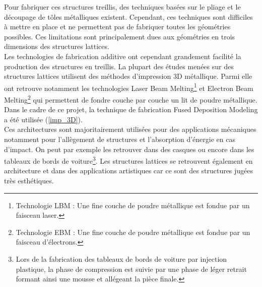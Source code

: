 \documentclass[a4paper]{article}
\begin{document}
	Pour fabriquer ces structures treillis, des techniques basées sur le pliage et le découpage de tôles métalliques existent. Cependant, ces techniques sont difficiles à mettre en place et ne
	permettent pas de fabriquer toutes les géométries possibles. Ces limitations sont principalement dues aux géométries en trois dimensions des structures lattices.\\
	
	Les technologies de fabrication additive ont cependant grandement facilité la production des structures en treillis. La plupart des études menées sur des structures lattices utilisent des méthodes d'impression 3D métallique. Parmi elle ont retrouve notamment les technologies Laser Beam Melting\footnote{Technologie LBM : Une fine couche de poudre métallique est fondue par un faisceau laser.} et Electron Beam Melting\footnote{Technologie EBM : Une fine couche de poudre métallique est fondue par un faisceau d'électrons.} qui permettent de fondre couche par couche un lit de poudre métallique. Dans le cadre de ce projet, la technique de fabrication Fused Deposition Modeling a été utilisée (\ref{imp_3D}).\\
	
	Ces architectures sont majoritairement utilisées pour des applications mécaniques notamment pour l'allègement de structures et l'absorption d'énergie en cas d'impact. On peut par exemple les retrouver dans des casques ou encore dans les tableaux de bords de voiture\footnote{Lors de la fabrication des tableaux de bords de voiture par injection plastique, la phase de compression est suivie par une phase de léger retrait formant ainsi une mousse et allégeant la pièce finale.}. Les structures lattices se retrouvent également en architecture et dans des applications artistiques car ce sont des structures jugées très esthétiques.
	
\end{document}
